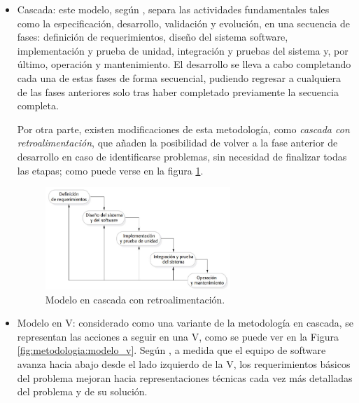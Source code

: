     \begin{itemize}
        \item Cascada: este modelo, según  \cite{sommerville_software_2011}, separa las actividades fundamentales tales como la especificación, desarrollo, validación y evolución, en una secuencia de fases: definición de requerimientos, diseño del sistema software, implementación y prueba de unidad, integración y pruebas del sistema y, por último, operación y mantenimiento. El desarrollo se lleva a cabo completando cada una de estas fases de forma secuencial, pudiendo regresar a cualquiera de las fases anteriores solo tras haber completado previamente la secuencia completa.
    
        Por otra parte, existen modificaciones de esta metodología, como \textit{cascada con retroalimentación}, que añaden la posibilidad de volver a la fase anterior de desarrollo en caso de identificarse problemas, sin necesidad de finalizar todas las etapas; como puede verse en la figura \ref{fig:metodologia:cascada_retroalimentada}.
    
        \begin{figure}[h]
            \centering
            \includegraphics[width=0.66\textwidth]{figures/cascada retroalimentada.JPG}
            \caption[Modelo en cascada con retroalimentación, extraído de \cite{sommerville_software_2011}]{Modelo en cascada con retroalimentación.}
            \label{fig:metodologia:cascada_retroalimentada}
        \end{figure}
        
        \item Modelo en V: considerado como una variante de la metodología en cascada, se representan las acciones a seguir en una V, como se puede ver en la Figura \ref{fig:metodologia:modelo_v}. Según \cite{pressman_software_2005}, a medida que el equipo de software avanza hacia abajo desde el lado izquierdo de la V, los requerimientos básicos del problema mejoran hacia representaciones técnicas cada vez más detalladas del problema y de su solución. 
        

\end{itemize}

